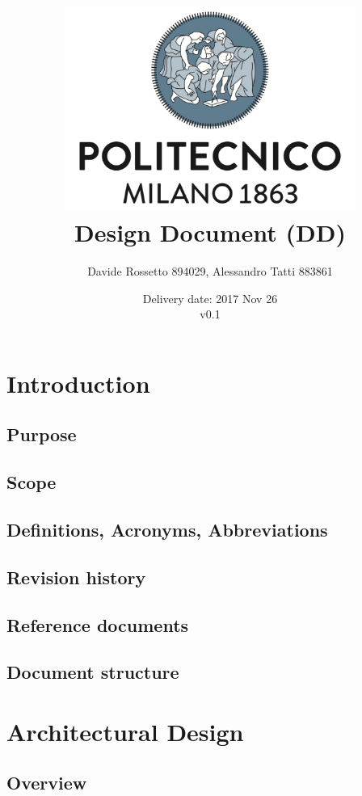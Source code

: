 \documentclass{article}
\title{ 
	\includegraphics[width=95mm]{img/PolimiLogo.png} \\
	\bigskip
	Design Document (DD)
}
\author{
	Davide Rossetto 894029, Alessandro Tatti 883861
}
\date{
	Delivery date: 2017 Nov 26\\
	\bigskip v0.1
}
\begin{document}
	
\maketitle
\newpage
\tableofcontents
\newpage
	
	
	\section{Introduction}
	

	
	\subsection{Purpose}
	
	
	
	\subsection{Scope}
	

	
	\subsection{Definitions, Acronyms, Abbreviations}
	
	
	
	\subsection{Revision history}
	
	
	
	\subsection{Reference documents}
	
	
	
	\subsection{Document structure}


	\section{Architectural Design}


	\subsection{Overview}
\end{document}
